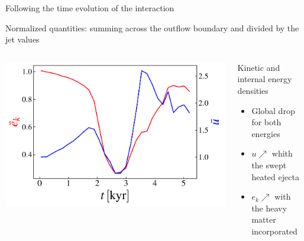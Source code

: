\begin{frame}{Following the time evolution of the interaction}
		
		{\scriptsize Normalized quantities: summing across the outflow boundary and divided by the jet values}
	\begin{columns}
	 \begin{column}{0.5\textwidth}
      \includegraphics[width=\linewidth]{images/evolution_integrated_xz_u_uk_2_riot.pdf}
     \end{column}
	 \begin{column}{0.5\textwidth}
		{\footnotesize
		\begin{block}{Kinetic and internal energy densities}
			\begin{itemize}
				\item Global drop for both energies
				\item $u \nearrow$ whith the swept heated ejecta 
				\item $e_k \nearrow$ with the heavy matter incorporated
			\end{itemize}
		\end{block}}
	\end{column}
	\end{columns}
	\begin{columns}

	   \begin{column}{.5\textwidth}


\end{column}
\end{columns}
\end{frame}
